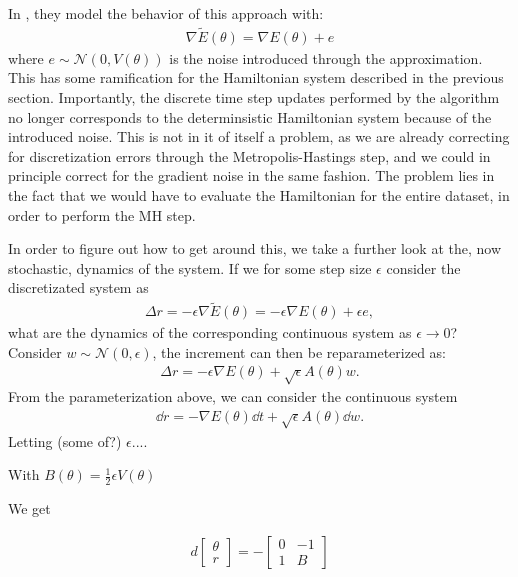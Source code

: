 In \cite{chen_stochastic_2014}, they model the behavior of this approach with:
\begin{align*}
    \nabla\tilde{E}(\theta) = \nabla{E}(\theta) + e
\end{align*}
where $e \sim \mathcal{N}(0, V(\theta))$ is the noise introduced through the approximation. This has some ramification for the Hamiltonian system described in the previous section. 
Importantly, the discrete time step updates performed by the algorithm no longer corresponds to the determinsistic Hamiltonian system because of the introduced noise. 
This is not in it of itself a problem, as we are already correcting for discretization errors through the Metropolis-Hastings step, and we could in principle correct for the gradient noise in the same fashion.
The problem lies in the fact that we would have to evaluate the Hamiltonian for the entire dataset, in order to perform the MH step.

In order to figure out how to get around this, we take a further look at the, now stochastic, dynamics of the system. If we for some step size $\epsilon$ consider the discretizated system as
\begin{align*}
\Delta r =  -\epsilon\nabla{\tilde{E}}(\theta) = -\epsilon\nabla{E}(\theta)  + \epsilon e,
\end{align*}
what are the dynamics of the corresponding continuous system as $\epsilon \to 0$? Consider $w \sim \mathcal{N}(0, \epsilon)$, the increment can then be reparameterized as:
\begin{align*}
    \Delta r  = -\epsilon\nabla{E}(\theta)  + \sqrt{\epsilon} A(\theta) w.
\end{align*}
From the parameterization above, we can consider the continuous system
\begin{align*}
    \dd r  = -\nabla{E}(\theta) \dd t  + \sqrt{\epsilon} A(\theta) \dd w.
\end{align*}
Letting (some of?) $\epsilon $....

With $B(\theta) = \frac{1}{2}\epsilon V(\theta)$

We get 

\begin{align*}
    d\begin{bmatrix}
        \theta \\
        r
    \end{bmatrix} = - \begin{bmatrix}
        0 & -1 \\ 
        1 &  B 
    \end{bmatrix}
\end{align*}




